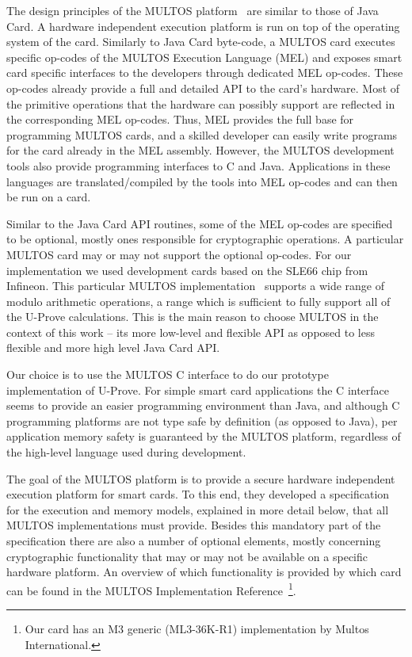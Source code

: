 The design principles of the MULTOS
platform~\cite{MULTOS2005,MULTOS_Manual2009} are similar to those of
Java Card. A hardware independent execution platform is run on top of
the operating system of the card. Similarly to Java Card byte-code, a
MULTOS card executes specific op-codes of the MULTOS Execution
Language (MEL) and exposes smart card specific interfaces to the
developers through dedicated MEL op-codes. These
op-codes already provide a full and detailed API to the card's
hardware. Most of the primitive operations that the hardware can
possibly support are reflected in the corresponding MEL
op-codes. Thus, MEL provides the full base for programming MULTOS
cards, and a skilled developer can easily write programs for the
card already in the MEL assembly. However, the MULTOS development
tools also provide programming interfaces to C and Java. Applications
in these languages are translated\slash compiled by the tools into MEL op-codes and
can then be run on a card.

Similar to the Java Card API routines, some of the MEL op-codes are
specified to be optional, mostly ones responsible for cryptographic
operations. A particular MULTOS card may or
may not support the optional op-codes. For our implementation we used
development cards based on the SLE66 chip from Infineon. This particular
MULTOS implementation~\cite{MULTOS_Implementation2010} supports a wide
range of modulo arithmetic operations, a range which is sufficient
to fully support all of the U-Prove calculations.
This is the main reason to choose MULTOS in the context of this work --
its more low-level and flexible API as opposed to less flexible
and more high level Java Card API.


Our choice is to use the MULTOS C interface to do our prototype
implementation of U-Prove. For simple smart card applications the C
interface seems to provide an easier programming environment than
Java, and although C programming platforms are not type safe by
definition (as opposed to Java), per application memory safety is
guaranteed by the MULTOS platform, regardless of the high-level language
used during development.

The goal of the MULTOS platform is to provide a secure hardware independent
execution platform for smart cards. To this end, they developed a specification
for the execution and memory models, explained in more detail below, that all
MULTOS implementations must provide. Besides this mandatory part of the
specification there are also a number of optional elements, mostly concerning
cryptographic functionality that may or may not be available on a specific
hardware platform. An overview of which functionality is provided by which card
can be found in the MULTOS Implementation Reference~\cite{MIR2012}\footnote{Our
card has an M3 generic (ML3-36K-R1) implementation by Multos International.}.

